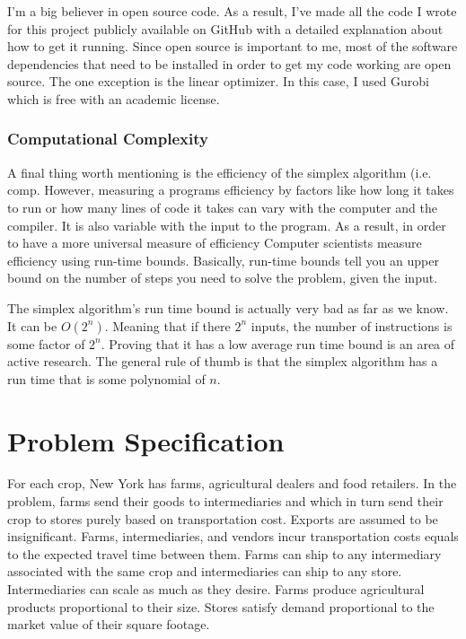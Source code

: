 \documentclass{report}
\begin{document}
I'm a big believer in open source code. As a result, I've made all the code I wrote for this project publicly available on GitHub with a detailed explanation about how to get it running. Since open source is important to me, most of the software dependencies that need to be installed in order to get my code working are open source. The one exception is the linear optimizer. In this case, I used Gurobi which is free with an academic license.

\subsection{Computational Complexity}
A final thing worth mentioning is the efficiency of the simplex algorithm (i.e. comp. However, measuring a programs efficiency by factors like how long it takes to run or how many lines of code it takes can vary with the computer and the compiler. It is also variable with the input to the program. As a result, in order to have a more universal measure of efficiency Computer scientists measure efficiency using run-time bounds. Basically, run-time bounds tell you an upper bound on the number of steps you need to solve the problem, given the input.

The simplex algorithm's run time bound is actually very bad as far as we know. It can be $O(2^n)$. Meaning that if there $2^n$ inputs, the number of instructions is some factor of $2^n$. Proving that it has a low average run time bound is an area of active research. The general rule of thumb is that the simplex algorithm has a run time that is some polynomial of $n$.

\chapter{Problem Specification}

For each crop, New York has farms, agricultural dealers and food retailers. In the problem, farms send their goods to intermediaries and which in turn send their crop to stores purely based on transportation cost. Exports are assumed to be insignificant. Farms, intermediaries, and vendors incur transportation costs equals to the expected travel time between them. Farms can ship to any intermediary associated with the same crop and intermediaries can ship to any store. Intermediaries can scale as much as they desire. Farms produce agricultural products proportional to their size. Stores satisfy demand proportional to the market value of their square footage. 
\end{document}
